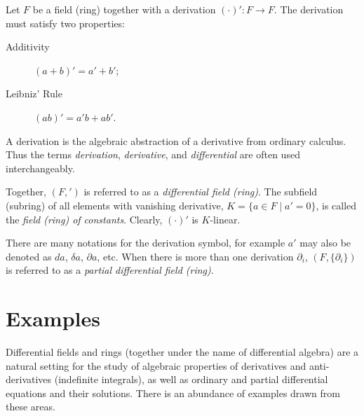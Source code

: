 \documentclass[12pt]{article}
\def\del{\partial}
\begin{document}
%
%
%
%
%
Let $F$ be a field (ring) together with a derivation $(\cdot)' \colon F \to F$.
The derivation must satisfy two properties:
\begin{description}
  \item[Additivity] $(a+b)' = a' + b'$;
  \item[Leibniz' Rule] $(ab)' = a'b+ab'$.
\end{description}
A derivation is the algebraic abstraction of a derivative from ordinary
calculus. Thus the terms \emph{derivation}, \emph{derivative}, and
\emph{differential} are often used interchangeably.

Together, $(F,{}')$ is referred to as a \emph{differential field (ring)}.
The subfield (subring) of all elements with vanishing derivative,
$K=\{ a\in F \mid a'=0 \}$,
is called the \emph{field (ring) of constants}. Clearly, $(\cdot)'$ is $K$-linear.

There are many notations for the derivation symbol, for example $a'$ may
also be denoted as $da$, $\delta a$, $\del a$, etc. When there is more
than one derivation $\del_i$, $(F,\{\del_i\})$ is referred to as a
\emph{partial differential field (ring)}.

\section{Examples}
Differential fields and rings (together under the name of differential algebra)
are a natural setting for the study of algebraic properties of derivatives
and anti-derivatives (indefinite integrals), as well as ordinary and partial differential
equations and their solutions. There is an abundance of examples drawn
from these areas.
\end{document}
